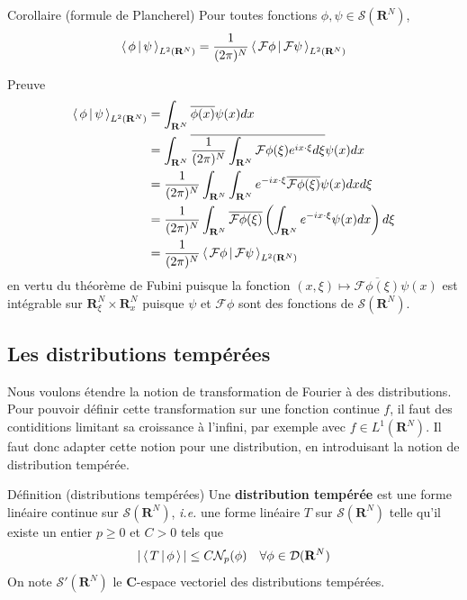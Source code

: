         \begin{omed}{Corollaire (formule de Plancherel)}
            Pour toutes fonctions $\phi, \psi \in \mathcal{S}(\mathbf{R}^N)$, 
            \[ \left< \, \phi \, \middle| \, \psi \, \right>_{L^2(\mathbf{R}^N)} = \frac{1}{(2\pi)^N}\left< \, \mathcal{F}\phi \, \middle| \, \mathcal{F}\psi \, \right>_{L^2(\mathbf{R}^N)} \]   
        \end{omed}

        \begin{demo}{Preuve}
            \begin{align*}
                \left< \, \phi \, \middle| \, \psi \, \right>_{L^2(\mathbf{R}^N)}
                &= \int_{\mathbf{R}^N} \overline{\phi(x)}\psi(x)dx \\
                &= \int_{\mathbf{R}^N} \overline{\frac{1}{(2\pi)^N} \int_{\mathbf{R}^N} \mathcal{F}\phi(\xi) e^{i x \cdot \xi} d\xi} \psi(x)dx \\
                &= \frac{1}{(2\pi)^N} \int_{\mathbf{R}^N} \int_{\mathbf{R}^N} e^{-ix \cdot \xi} \overline{\mathcal{F}\phi(\xi)} \psi(x)dx d\xi \\
                &= \frac{1}{(2\pi)^N} \int_{\mathbf{R}^N} \overline{\mathcal{F}\phi(\xi)} \left(\int_{\mathbf{R}^N} e^{-ix \cdot \xi} \psi(x)dx\right) d\xi \\
                &= \frac{1}{(2\pi)^N} \left< \, \mathcal{F}\phi \, \middle| \, \mathcal{F}\psi \, \right>_{L^2(\mathbf{R}^N)}
            \end{align*}
            en vertu du théorème de Fubini puisque la fonction $(x, \xi) \mapsto \overline{\mathcal{F}\phi(\xi)}\psi(x)$ est intégrable sur $\mathbf{R}^N_{\xi} \times \mathbf{R}^N_x$ puisque $\psi$ et $\mathcal{F}\phi$ sont des fonctions de $\mathcal{S}(\mathbf{R}^N)$. 
        \end{demo}

    \subsection{Les distributions tempérées}

        Nous voulons étendre la notion de transformation de Fourier à des distributions. Pour pouvoir définir cette transformation sur une fonction continue $f$, il faut des contiditions limitant sa croissance à l’infini, par exemple avec $f \in L^1(\mathbf{R}^N)$. Il faut donc adapter cette notion pour une distribution, en introduisant la notion de distribution tempérée.

        \begin{omed}{Définition (distributions tempérées)}
            Une \textbf{distribution tempérée} est une forme linéaire continue sur $\mathcal{S}(\mathbf{R}^N)$, \textit{i.e.} une forme linéaire $T$ sur $\mathcal{S}(\mathbf{R}^N)$ telle qu’il existe un entier $p \geq 0$ et $C >0$ tels que 
            \[ \left\lvert \, \left< \, T \, \middle| \, \phi \, \right> \, \right\rvert \leq C \mathcal{N}_p(\phi) \quad \forall \phi \in \mathcal{D}(\mathbf{R}^N) \]
            On note $\mathcal{S}'(\mathbf{R}^N)$ le $\mathbf{C}$-espace vectoriel des distributions tempérées.
        \end{omed}

